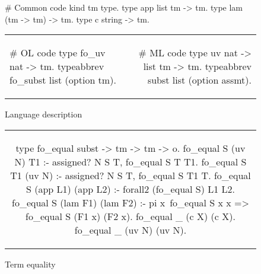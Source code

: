 \setlength{\abovecaptionskip}{0pt plus 3pt minus 2pt}
\begin{figure*}
  \begin{minipage}{.40\textwidth}

    \begin{elpicode}
      # Common code
      kind tm type.
      type app list tm -> tm.
      type lam (tm -> tm) -> tm.
      type c string -> tm.
    \end{elpicode}
    
  \end{minipage}

  \vspace{3pt}

  \begin{tabular}{lr}
    \begin{minipage}{.40\textwidth}

      \begin{elpicode}
        # OL code
        type fo_uv  nat -> tm.
        typeabbrev fo_subst list (option tm).
      \end{elpicode}
    \end{minipage}
    &
    \begin{minipage}{.40\textwidth}
      
      \begin{elpicode}
        # ML code
        type uv  nat -> list tm -> tm.
        typeabbrev subst list (option assmt).
      \end{elpicode}
    \end{minipage}
  \end{tabular}
  
  \caption{Language description}
  \label{code:lang-descr}
\end{figure*}



\begin{figure*}
  \begin{tabular}{c}
    \begin{minipage}{.80\textwidth}
      \begin{elpicode}
        type fo_equal subst -> tm -> tm -> o.
        fo_equal S (uv N) T1 :- assigned? N S T, fo_equal S T T1.
        fo_equal S T1 (uv N) :- assigned? N S T, fo_equal S T1 T.
        fo_equal S (app L1) (app L2) :- forall2 (fo_equal S) L1 L2.
        fo_equal S (lam F1) (lam F2) :- pi x\ fo_equal S x x => fo_equal S (F1 x) (F2 x).
        fo_equal _ (c X) (c X).
        fo_equal _ (uv N) (uv N).
      \end{elpicode}
    \end{minipage}
  \end{tabular}
  \caption{Term equality}
  \label{code:term-equal}
\end{figure*}

